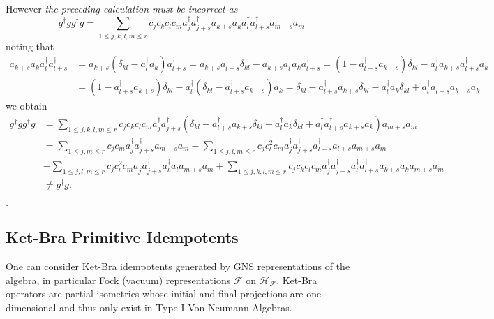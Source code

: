 \documentclass[aps,preprint]{revtex4}%
\begin{document}
However \emph{the preceding calculation must be incorrect as }%
\begin{equation}
g^{\dagger}gg^{\dagger}g=\sum_{1\leq j,k,l,m\leq r}c_{j}c_{k}c_{l}c_{m}%
a_{j}^{\dagger}a_{j+s}^{\dagger}a_{k+s}a_{k}a_{l}^{\dagger}a_{l+s}^{\dagger
}a_{m+s}a_{m}%
\end{equation}
noting that%
\begin{align}
a_{k+s}a_{k}a_{l}^{\dagger}a_{l+s}^{\dagger}  &  =a_{k+s}\left(  \delta
_{kl}-a_{l}^{\dagger}a_{k}\right)  a_{l+s}^{\dagger}=a_{k+s}a_{l+s}^{\dagger
}\delta_{kl}-a_{k+s}a_{l}^{\dagger}a_{k}a_{l+s}^{\dagger}=\left(
1-a_{l+s}^{\dagger}a_{k+s}\right)  \delta_{kl}-a_{l}^{\dagger}a_{k+s}%
a_{l+s}^{\dagger}a_{k}\\
&  =\left(  1-a_{l+s}^{\dagger}a_{k+s}\right)  \delta_{kl}-a_{l}^{\dagger
}\left(  \delta_{kl}-a_{l+s}^{\dagger}a_{k+s}\right)  a_{k}=\delta
_{kl}-a_{l+s}^{\dagger}a_{k+s}\delta_{kl}-a_{l}^{\dagger}a_{k}\delta
_{kl}+a_{l}^{\dagger}a_{l+s}^{\dagger}a_{k+s}a_{k}%
\end{align}
we obtain%
\begin{align}
g^{\dagger}gg^{\dagger}g  &  =\sum_{1\leq j,k,l,m\leq r}c_{j}c_{k}c_{l}%
c_{m}a_{j}^{\dagger}a_{j+s}^{\dagger}\left(  \delta_{kl}-a_{l+s}^{\dagger
}a_{k+s}\delta_{kl}-a_{l}^{\dagger}a_{k}\delta_{kl}+a_{l}^{\dagger}%
a_{l+s}^{\dagger}a_{k+s}a_{k}\right)  a_{m+s}a_{m}\\
&  =\sum_{1\leq j,m\leq r}c_{j}c_{m}a_{j}^{\dagger}a_{j+s}^{\dagger}%
a_{m+s}a_{m}-\sum_{1\leq j,l,m\leq r}c_{j}c_{l}^{2}c_{m}a_{j}^{\dagger}%
a_{j+s}^{\dagger}a_{l+s}^{\dagger}a_{l+s}a_{m+s}a_{m}\\
&  -\sum_{1\leq j,l,m\leq r}c_{j}c_{l}^{2}c_{m}a_{j}^{\dagger}a_{j+s}%
^{\dagger}a_{l}^{\dagger}a_{l}a_{m+s}a_{m}+\sum_{1\leq j,k,l,m\leq r}%
c_{j}c_{k}c_{l}c_{m}a_{j}^{\dagger}a_{j+s}^{\dagger}a_{l}^{\dagger}%
a_{l+s}^{\dagger}a_{k+s}a_{k}a_{m+s}a_{m}\\
&  \neq g^{\dagger}g.
\end{align}
$\rfloor$

\subsubsection{}

\subsection{Ket-Bra Primitive Idempotents}

One can consider Ket-Bra idempotents generated by GNS representations of the
algebra, in particular Fock (vacuum) representations $\mathcal{F}$ on
$\mathcal{H}_{\mathcal{F}}$. Ket-Bra operators are partial isometries whose
initial and final projections are one dimensional and thus only exist in Type
I Von Neumann Algebras. 
\end{document}

